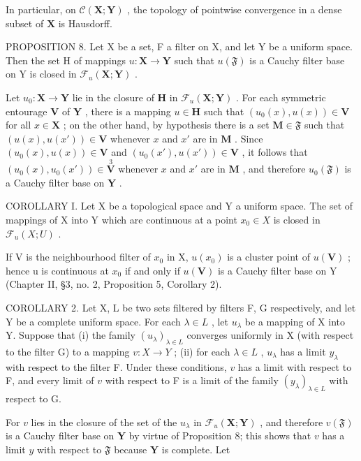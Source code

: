 In particular, on \(\mathcal{C}(\mathbf{X};\mathbf{Y})\) , the topology of pointwise convergence in a dense subset of \(\mathbf{X}\) is Hausdorff.

PROPOSITION 8. Let X be a set, F a filter on X, and let Y be a uniform space. Then the set H of mappings \(u: \mathbf{X} \to \mathbf{Y}\) such that \(u(\mathfrak{F})\) is a Cauchy filter base on Y is closed in \(\mathcal{F}_u(\mathbf{X}; \mathbf{Y})\) .

Let \(u_0: \mathbf{X} \to \mathbf{Y}\) lie in the closure of \(\mathbf{H}\) in \(\mathcal{F}_u(\mathbf{X}; \mathbf{Y})\) . For each symmetric entourage \(\mathbf{V}\) of \(\mathbf{Y}\) , there is a mapping \(u \in \mathbf{H}\) such that \((u_0(x), u(x)) \in \mathbf{V}\) for all \(x \in \mathbf{X}\) ; on the other hand, by hypothesis there is a set \(\mathbf{M} \in \mathfrak{F}\) such that \((u(x), u(x')) \in \mathbf{V}\) whenever \(x\) and \(x'\) are in \(\mathbf{M}\) . Since \((u_0(x), u(x)) \in \mathbf{V}\) and \((u_0(x'), u(x')) \in \mathbf{V}\) , it follows that \((u_0(x), u_0(x')) \in \overset{3}{\mathbf{V}}\) whenever \(x\) and \(x'\) are in \(\mathbf{M}\) , and therefore \(u_0(\mathfrak{F})\) is a Cauchy filter base on \(\mathbf{Y}\) .

COROLLARY I. Let X be a topological space and Y a uniform space. The set of mappings of X into Y which are continuous at a point \(x_{0} \in X\) is closed in \(\mathcal{F}_{u}(X; U)\) .

If V is the neighbourhood filter of \(x_{0}\) in X, \(u(x_{0})\) is a cluster point of \(u(\mathbf{V})\) ; hence u is continuous at \(x_{0}\) if and only if \(u(\mathbf{V})\) is a Cauchy filter base on Y (Chapter II, §3, no. 2, Proposition 5, Corollary 2).

COROLLARY 2. Let X, L be two sets filtered by filters F, G respectively, and let Y be a complete uniform space. For each \(\lambda \in L\) , let \(u_{\lambda}\) be a mapping of X into Y. Suppose that (i) the family \((u_{\lambda})_{\lambda \in L}\) converges uniformly in X (with respect to the filter G) to a mapping \(v: X \to Y\) ; (ii) for each \(\lambda \in L\) , \(u_{\lambda}\) has a limit \(y_{\lambda}\) with respect to the filter F. Under these conditions, \(v\) has a limit with respect to F, and every limit of \(v\) with respect to F is a limit of the family \((y_{\lambda})_{\lambda \in L}\) with respect to G.

For \(v\) lies in the closure of the set of the \(u_{\lambda}\) in \(\mathcal{F}_u(\mathbf{X};\mathbf{Y})\) , and therefore \(v(\mathfrak{F})\) is a Cauchy filter base on \(\mathbf{Y}\) by virtue of Proposition 8; this shows that \(v\) has a limit \(y\) with respect to \(\mathfrak{F}\) because \(\mathbf{Y}\) is complete. Let

